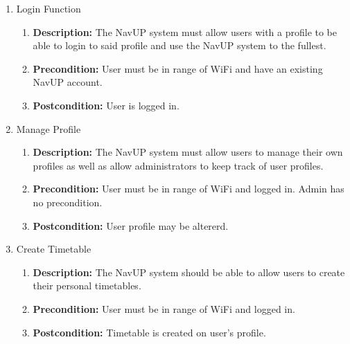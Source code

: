 \documentclass{article}
\begin{document}
\begin{enumerate}
\begin{enumerate}
		\item Login Function
		\begin{enumerate}
			\item \textbf{Description:} The NavUP system must allow users with a profile to be able to login to said profile and use the NavUP system to the fullest. 
			\item \textbf{Precondition:} User must be in range of WiFi and have an existing NavUP account.
			\item \textbf{Postcondition:} User is logged in.\newline
		\end{enumerate}
		
		\item Manage Profile
		\begin{enumerate}
			\item \textbf{Description:} The NavUP system must allow users to manage their own profiles as well as allow administrators to keep track of user profiles. 
			\item \textbf{Precondition:} User must be in range of WiFi and logged in. Admin has no precondition.  
			\item \textbf{Postcondition:} User profile may be altererd.\newline
		\end{enumerate}
		
		\item Create Timetable
		\begin{enumerate}
			\item \textbf{Description:} The NavUP system should be able to allow users to create their personal timetables. 
			\item \textbf{Precondition:} User must be in range of WiFi and logged in.
			\item \textbf{Postcondition:} Timetable is created on user's profile.\newline
		\end{enumerate}
		

\end{enumerate}
\end{enumerate}
\end{document}
